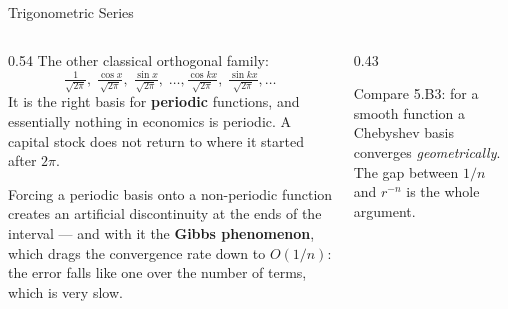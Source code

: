 \begin{frame}{Trigonometric Series}
\begin{columns}[T]
\begin{column}{0.54\textwidth}
\small
The other classical orthogonal family:
\[
  \tfrac{1}{\sqrt{2\pi}},\;\tfrac{\cos x}{\sqrt{2\pi}},\;\tfrac{\sin x}{\sqrt{2\pi}},\;\dots,
  \tfrac{\cos kx}{\sqrt{2\pi}},\;\tfrac{\sin kx}{\sqrt{2\pi}},\dots
\]
\medskip
It is the right basis for \textbf{periodic} functions, and essentially nothing in economics is periodic. A capital stock does not return to where it started after $2\pi$.
\medskip

Forcing a periodic basis onto a non-periodic function creates an artificial discontinuity at the ends of the interval --- and with it the \textbf{Gibbs phenomenon}, which drags the convergence rate down to $O(1/n)$: the error falls like one over the number of terms, which is very slow.
\end{column}
\begin{column}{0.43\textwidth}
\begin{examplebox}\footnotesize
Compare 5.B3: for a smooth function a Chebyshev basis converges \emph{geometrically}. The gap between $1/n$ and $r^{-n}$ is the whole argument.
\end{examplebox}
\end{column}
\end{columns}
\vspace{1mm}
\end{frame}

